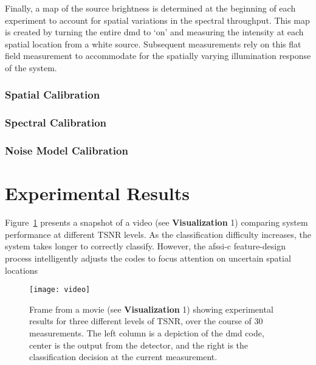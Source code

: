 Finally, a map of the source brightness is determined at the beginning of each experiment to account for spatial variations in the spectral throughput. This map is created by turning the entire \gls{dmd} to `on' and measuring the intensity at each spatial location from a white source. Subsequent measurements rely on this flat field measurement to accommodate for the spatially varying illumination response of the system.

\subsubsection{Spatial Calibration}

\subsubsection{Spectral Calibration}

\subsubsection{Noise Model Calibration}

\section{Experimental Results}


Figure~\ref{fig:video} presents a snapshot of a video (see \textbf{Visualization} 1) comparing system performance at different TSNR levels. As the classification difficulty increases, the system takes longer to correctly classify. However, the \gls{afssi-c} feature-design process intelligently adjusts the codes to focus attention on uncertain spatial locations

 \begin{figure}[htb]
  \centering
  \texttt{[image: video]}\\
  \caption{Frame from a movie (see \textbf{Visualization} 1) showing experimental results for three different levels of TSNR, over the course of 30 measurements. The left column is a depiction of the \gls{dmd} code, center is the output from the detector, and the right is the classification decision at the current measurement.}\label{fig:video}
\end{figure}

